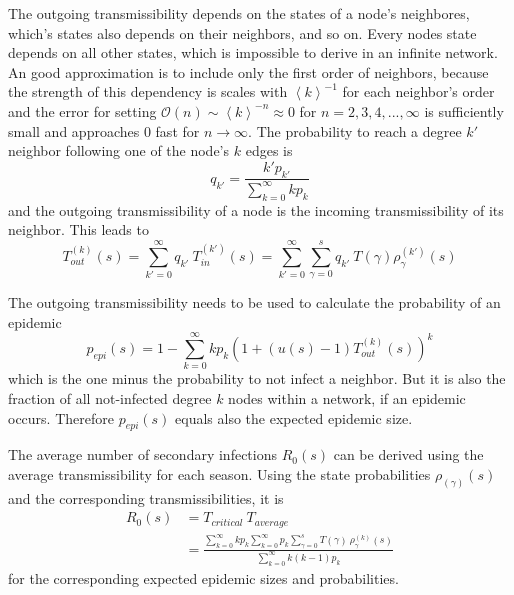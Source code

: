 \documentclass[11pt, a4paper]{article}
\begin{document}
The outgoing transmissibility depends on the states of a node's neighbores, which's states also depends on their neighbors, and so on. Every nodes state depends on all other states, which is impossible to derive in an infinite network. An good approximation is to include only the first order of neighbors, because the strength of this dependency is scales with $\left\langle k \right\rangle ^{-1} $ for each neighbor's order and the error for setting $\mathcal{O}(n) \sim \left\langle k \right\rangle ^{-n}  \approx 0$ for $n = 2,3,4,..., \infty$ is sufficiently small and approaches $0$ fast for $n\rightarrow \infty$. The probability to reach a degree $k'$ neighbor following one of the node's $k$ edges is
\begin{equation}
q_{k'} = \frac{k' p_{k'}} { \sum\limits_{k=0}^{\infty} k p_{k}}
\end{equation}
and the outgoing transmissibility of a node is the incoming transmissibility of its neighbor. This leads to
\begin{equation}
T_{out}^{(k)} (s) = \sum\limits_{k'=0}^{\infty} q_{k'} \: T_{in}^{(k')} (s) = \sum\limits_{k'=0}^{\infty} \sum\limits_{\gamma = 0}^{s} q_{k'} \: T(\gamma) \rho_{\gamma}^{(k')} (s)
\end{equation}

The outgoing transmissibility needs to be used to calculate the probability of an epidemic
\begin{equation}
p_{epi} (s) = 1 -  \sum \limits_{k=0}^{\infty} k p_{k} \left( 1+\left( u (s) - 1 \right) T_{out}^{(k)} (s) \right) ^{k}
\end{equation}
which is the one minus the probability to not infect a neighbor. But it is also the fraction of all not-infected degree $k$ nodes within a network, if an epidemic occurs. Therefore $p_{epi}(s)$ equals also the expected epidemic size.

The average number of secondary infections $R_{0} (s)$ can be derived using the average transmissibility for each season. Using the state probabilities $\rho_(\gamma) (s)$ and the corresponding transmissibilities, it is
\begin{equation}
\begin{split}
R_{0} (s) & = T_{critical} \: T_{average} \\
& = \frac {\sum\limits_{k=0}^{\infty} k p_k \sum\limits_{k=0}^{\infty} p_{k} \sum\limits_{\gamma = 0}^{s} T (\gamma) \: \rho_{\gamma}^{(k)}(s)}{\sum\limits_{k=0}^{\infty} k (k-1) p_k}
\end{split}
\end{equation}
for the corresponding expected epidemic sizes and probabilities.
\end{document}
